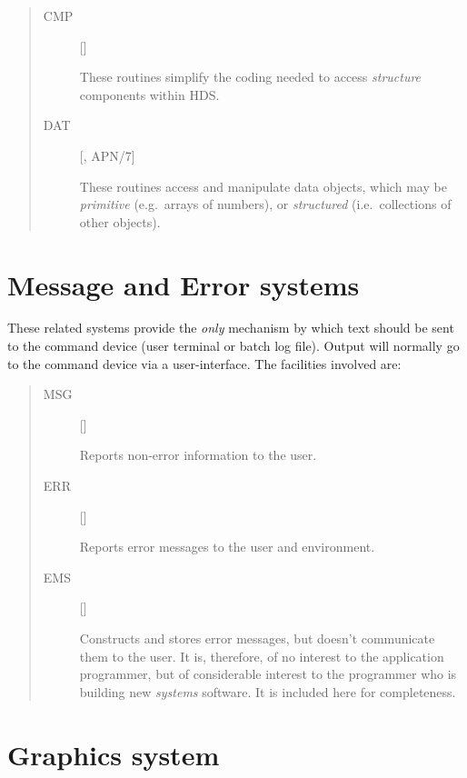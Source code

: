\begin{quote}
\begin{description}
\item [CMP] \hfill []

 These routines simplify the coding needed to access {\em structure} components
 within HDS.

\item [DAT] \hfill [, APN/7]

 These routines access and manipulate data objects, which may be
 {\em primitive}\/ (e.g.\ arrays of numbers), or {\em structured}\/
 (i.e.\ collections of other objects).

\end{description}
\end{quote}

\section{Message and Error systems}
\label{S_errmess}

These related systems provide the {\em only} mechanism by which text should be
sent to the command device (user terminal or batch log file).
Output will normally go to the command device via a user-interface.
The facilities involved are:
\begin{quote}
\begin{description}

\item [MSG] \hfill []

 Reports non-error information to the user.

\item [ERR] \hfill []

 Reports error messages to the user and environment.

\item [EMS] \hfill []

 Constructs and stores error messages, but doesn't communicate them to the user.
 It is, therefore, of no interest to the application programmer, but of
 considerable interest to the programmer who is building new {\em systems}
 software.
 It is included here for completeness.

\end{description}
\end{quote}

\section{Graphics system}
\label{S_graphics}

